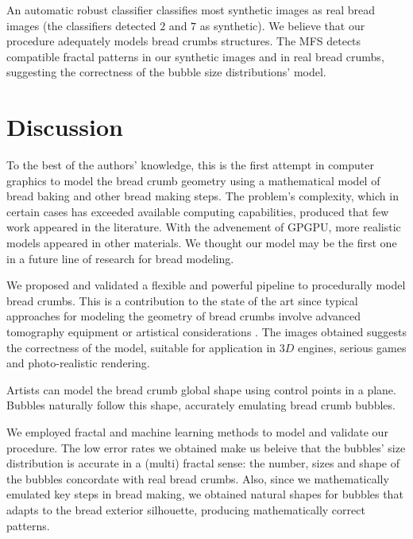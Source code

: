 \documentclass[final,5p,times]{elsarticle}
\begin{document}
An automatic robust classifier classifies most synthetic images as real bread images (the classifiers detected $2$ and $7$ as synthetic). We believe that our procedure adequately models bread crumbs structures. The MFS detects compatible fractal patterns in our synthetic images and in real bread crumbs, suggesting the correctness of the bubble size distributions' model.






\section{Discussion}
To the best of the authors' knowledge, this is the first attempt in computer graphics to model the bread crumb geometry using a mathematical model of bread baking and other bread making steps. The problem's complexity, which in certain cases has exceeded available computing capabilities, produced that few work appeared in the literature. With the advenement of GPGPU, more realistic models appeared in other materials. We thought our model may be the first one in a future line of research for bread modeling. 

We proposed and validated a flexible and powerful pipeline to procedurally model bread crumbs. This is a contribution to the state of the art since typical approaches for modeling the geometry of bread crumbs involve advanced tomography equipment \cite{VanDyck2014} or artistical considerations \cite{Cho2007}. The images obtained suggests the correctness of the model, suitable for application in $3D$ engines, serious games and photo-realistic rendering.

Artists can model the bread crumb global shape using control points in a plane. Bubbles naturally follow this shape, accurately emulating bread crumb bubbles.

We employed fractal and machine learning methods to model and validate our procedure. The low error rates we obtained make us beleive that the bubbles' size distribution is accurate in a (multi) fractal sense: the number, sizes and shape of the bubbles concordate with real bread crumbs. Also, since we mathematically emulated key steps in bread making, we obtained natural shapes for bubbles that adapts to the bread exterior silhouette, producing mathematically correct patterns.
\end{document}
